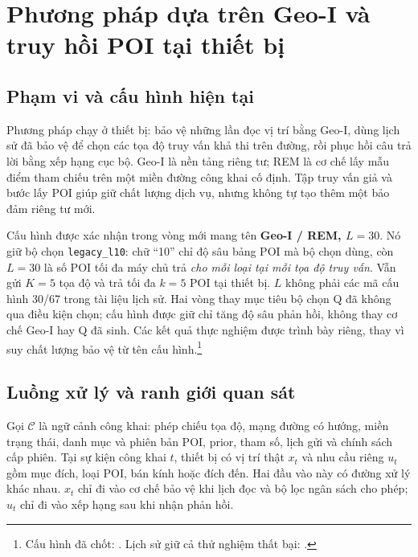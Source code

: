 \chapter{Phương pháp dựa trên Geo-I và truy hồi POI tại thiết bị}
\label{ch:method}
\label{ch:current-method}

\section{Phạm vi và cấu hình hiện tại}
\label{sec:current-method-scope}

Phương pháp chạy ở thiết bị: bảo vệ những lần đọc vị trí bằng Geo-I, dùng lịch sử đã bảo vệ để chọn các tọa độ truy vấn khả thi trên đường, rồi phục hồi câu trả lời bằng xếp hạng cục bộ. Geo-I là nền tảng riêng tư; REM là cơ chế lấy mẫu điểm tham chiếu trên một miền đường công khai cố định. Tập truy vấn giả và bước lấy POI giúp giữ chất lượng dịch vụ, nhưng không tự tạo thêm một bảo đảm riêng tư mới.

Cấu hình được xác nhận trong vòng mới mang tên \textbf{Geo-I / REM, $L=30$}. Nó giữ bộ chọn \texttt{legacy\_l10}: chữ ``10'' chỉ độ sâu bảng POI mà bộ chọn dùng, còn $L=30$ là số POI tối đa máy chủ trả \emph{cho mỗi loại tại mỗi tọa độ truy vấn}. Vẫn gửi $K=5$ tọa độ và trả tối đa $k=5$ POI tại thiết bị. $L$ không phải các mã cấu hình 30/67 trong tài liệu lịch sử. Hai vòng thay mục tiêu bộ chọn Q đã không qua điều kiện chọn; cấu hình được giữ chỉ tăng độ sâu phản hồi, không thay cơ chế Geo-I hay Q đã sinh. Các kết quả thực nghiệm được trình bày riêng, thay vì suy chất lượng bảo vệ từ tên cấu hình.\footnote{Cấu hình đã chốt: . Lịch sử giữ cả thử nghiệm thất bại: .}

\section{Luồng xử lý và ranh giới quan sát}
\label{sec:current-method-flow}

Gọi $\mathcal C$ là ngữ cảnh công khai: phép chiếu tọa độ, mạng đường có hướng, miền trạng thái, danh mục và phiên bản POI, prior, tham số, lịch gửi và chính sách cấp phiên. Tại sự kiện công khai $t$, thiết bị có vị trí thật $x_t$ và nhu cầu riêng $u_t$ gồm mục đích, loại POI, bán kính hoặc đích đến. Hai đầu vào này có đường xử lý khác nhau. $x_t$ chỉ đi vào cơ chế bảo vệ khi lịch đọc và bộ lọc ngân sách cho phép; $u_t$ chỉ đi vào xếp hạng sau khi nhận phản hồi.

